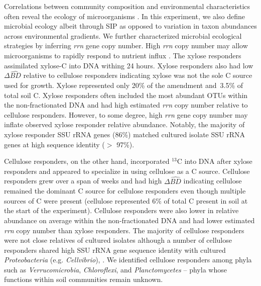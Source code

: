 Correlations between community composition and environmental characteristics
often reveal the ecology of microorganisms \citep{Fierer2007}. In this
experiment, we also define microbial ecology albeit through SIP as opposed to
variation in taxon abundances across environmental gradients. We further
characterized microbial ecological strategies by inferring \textit{rrn} gene
copy number. High \textit{rrn} copy number may allow microorganisms to rapidly
respond to nutrient influx \citep{Klappenbach_2000}. The xylose responders
assimilated xylose-C into DNA withing 24 hours. Xylose responders also had low
$\Delta\hat{BD}$ relative to cellulose responders indicating xylose
was not the sole C source used for growth. Xylose represented only 20\% of the
amendment and~3.5\% of total soil C. Xylose responders often included the most
abundant OTUs within the non-fractionated DNA and had high estimated
\textit{rrn} copy number relative to cellulose responders. However, to some
degree, high \textit{rrn} gene copy number may inflate observed xylose
responder relative abundance. Notably, the majority of xylose responder SSU
rRNA genes (86\%) matched cultured isolate SSU rRNA genes at high sequence
identity ($>$ 97\%). 

Cellulose responders, on the other hand, incorporated $^{13}$C into DNA after
xylose responders and appeared to specialize in using cellulose as a C source.
Cellulose responders grew over a span of weeks and had high $\Delta\hat{BD}$
indicating cellulose remained the dominant C source for cellulose responders
even though multiple sources of C were present (cellulose represented 6\% of
total C present in soil at the start of the experiment). Cellulose responders
were also lower in relative abundance on average within the non-fractionated
DNA and had lower estimated \textit{rrn} copy number than xylose responders.
The majority of cellulose responders were not close relatives of cultured
isolates although a number of cellulose responders shared high SSU rRNA gene
sequence identity with cultured \textit{Proteobacteria} (e.g.
\textit{Cellvibrio}), . We identified cellulose responders among phyla such as
\textit{Verrucomicrobia}, \textit{Chloroflexi}, and \textit{Planctomycetes} --
phyla whose functions within soil communities remain unknown.

